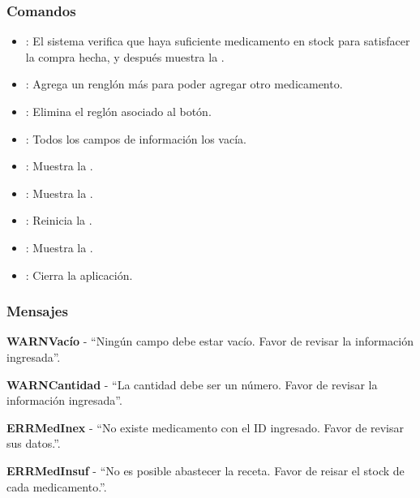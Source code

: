 \subsubsection{Comandos}
\begin{itemize}
		\item {}: El sistema verifica que haya suficiente medicamento en stock para satisfacer la compra hecha, y despu\'es muestra la \label{IUConfirmar}.
		\item {}: Agrega un rengl\'on m\'as para poder agregar otro medicamento.
		\item {}: Elimina el regl\'on asociado al bot\'on.
		\item {}: Todos los campos de informaci\'on los vac\'ia.
		\item {}: Muestra la \label{IUConsulta}.
		\item {}: Muestra la \label{IUBusqueda}.
		\item {}: Reinicia la \label{IUCompra}.
		\item {}: Muestra la \label{IUCompra}.
		\item {}: Cierra la aplicaci\'on.
\end{itemize}

\subsubsection{Mensajes}
	\begin{Citemize}
		\item {\bf WARNVac\'io} - "`Ning\'un campo debe estar vac\'io. Favor de revisar la informaci\'on ingresada"'.
		\item {\bf WARNCantidad} - "`La cantidad debe ser un n\'umero. Favor de revisar la informaci\'on ingresada"'.
		\item {\bf ERRMedInex} - "`No existe medicamento con el ID ingresado. Favor de revisar sus datos."'.
		\item {\bf ERRMedInsuf} - "`No es posible abastecer la receta. Favor de reisar el stock de cada medicamento."'.
	\end{Citemize}